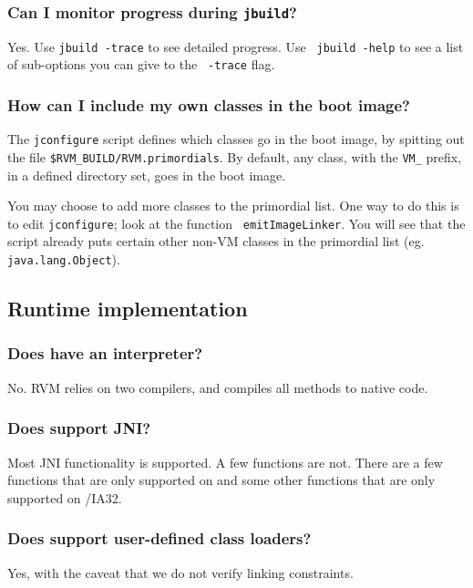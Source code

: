 \subsubsection{Can I monitor progress during {\tt jbuild}?}

Yes.  Use {\tt jbuild -trace} to see detailed progress.  Use {\tt
jbuild -help} to see a list of sub-options you can give to the {\tt
-trace} flag.

\subsubsection{How can I include my own classes in the boot image?}

The {\tt jconfigure} script defines which classes go in the boot image, by
spitting out the file {\tt \$RVM\_BUILD/RVM.primordials}.  By default, any
class, with the {\tt VM\_} prefix, in a defined directory set, goes in the
boot image.

You may choose to add more classes to the primordial list.  One way to do
this is to edit {\tt jconfigure}; look at the function {\tt
emitImageLinker}.  You will see that the script already puts certain other
non-VM classes in the primordial list (eg. {\tt java.lang.Object}).

\AIXTMFooter

\subsection{Runtime implementation}

\subsubsection{Does \jrvm{} have an interpreter?}

No.  RVM relies on two compilers, and compiles all methods to native code.

\subsubsection{Does \jrvm{} support JNI?}

Most JNI functionality is supported. A few functions are not. 
There are a few functions that are only supported on \AIXTM{}
and some other functions that are only supported on \LinuxR{}/IA32.

\subsubsection{Does \jrvm{} support user-defined class loaders?}
Yes, with the caveat that we do not verify linking constraints.

